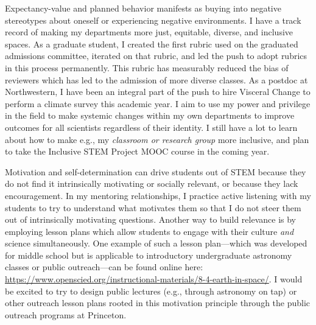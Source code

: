 \documentclass[11pt]{article}
\begin{document}
Expectancy-value and planned behavior manifests as buying into negative stereotypes about oneself or experiencing negative environments.
I have a track record of making my departments more just, equitable, diverse, and inclusive spaces.
As a graduate student, I created the first rubric used on the graduated admissions committee, iterated on that rubric, and led the push to adopt rubrics in this process permanently.
This rubric has measurably reduced the bias of reviewers which has led to the admission of more diverse classes.
As a postdoc at Northwestern, I have been an integral part of the push to hire Visceral Change to perform a climate survey this academic year.
I aim to use my power and privilege in the field to make systemic changes within my own departments to improve outcomes for all scientists regardless of their identity.
I still have a lot to learn about how to make e.g., my \emph{classroom or research group} more inclusive, and plan to take the Inclusive STEM Project MOOC course in the coming year.

Motivation and self-determination can drive students out of STEM because they do not find it intrinsically motivating or socially relevant, or because they lack encouragement.
In my mentoring relationships, I practice active listening \citep{jahromi_etal_2016} with my students to try to understand what motivates them so that I do not steer them out of intrinsically motivating questions.
Another way to build relevance is by employing lesson plans which allow students to engage with their culture \emph{and} science simultaneously.
One example of such a lesson plan---which was developed for middle school but is applicable to introductory undergraduate astronomy classes or public outreach---can be found online here: \url{https://www.openscied.org/instructional-materials/8-4-earth-in-space/}.
I would be excited to try to design public lectures (e.g., through astronomy on tap) or other outreach lesson plans rooted in this motivation principle through the public outreach programs at Princeton.

\end{document}
